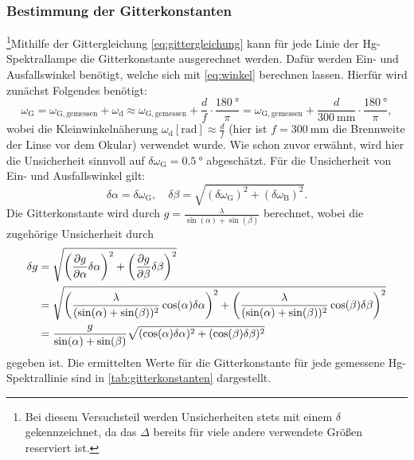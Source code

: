 \subsubsection{Bestimmung der Gitterkonstanten}\label{subsubsec:gitterkonstante}
\footnote[1]{Bei diesem Versuchsteil werden Unsicherheiten stets mit einem $\delta$ gekennzeichnet, da das $\Delta$ bereits für viele andere verwendete Größen reserviert ist.}Mithilfe der Gittergleichung \ref{eq:gittergleichung} kann für jede Linie der Hg-Spektrallampe die Gitterkonstante ausgerechnet werden. Dafür werden Ein- und Ausfallswinkel
benötigt, welche sich mit \cref{eq:winkel} berechnen lassen. Hierfür wird zunächst Folgendes benötigt:
\begin{equation*}
    \omega_{\mathrm{G}} = \omega_{\mathrm{G,gemessen}} + \omega_{\mathrm{d}} \approx \omega_{\mathrm{G,gemessen}} + \frac{d}{f} \cdot \frac{\SI{180}{\degree}}{\pi} = \omega_{\mathrm{G,gemessen}} + \frac{d}{\SI{300}{\milli \meter}} \cdot \frac{\SI{180}{\degree}}{\pi} ,
\end{equation*} wobei die Kleinwinkelnäherung $\omega_{\mathrm{d}} [\unit{\radian}] \approx \frac{d}{f}$ (hier ist $f = \SI{300}{\milli \meter}$ die Brennweite der Linse vor dem Okular) verwendet wurde.
Wie schon zuvor erwähnt, wird hier die Unsicherheit sinnvoll auf $\delta \omega_{\mathrm{G}} = \SI{0,5}{\degree}$ abgeschätzt. Für die Unsicherheit von Ein- und Ausfallswinkel gilt:
\begin{equation*}
    \delta \alpha = \delta \omega_{\mathrm{G}} , \quad \delta \beta = \sqrt{(\delta \omega_{\mathrm{G}})^2 + (\delta \omega_{\mathrm{B}})^2} .
\end{equation*} Die Gitterkonstante wird durch $g = \frac{\lambda}{\sin(\alpha) + \sin(\beta)}$ berechnet, wobei die zugehörige Unsicherheit durch
\begin{align*}
    \delta g &= \sqrt{\left(\pdv{g}{\alpha} \delta \alpha\right)^2 + \left(\pdv{g}{\beta} \delta \beta\right)^2} \\
    &= \sqrt{\left(\frac{\lambda}{(\sin(\alpha) + \sin(\beta))^2} \cos(\alpha) \delta \alpha\right)^2 + \left(\frac{\lambda}{(\sin(\alpha) + \sin(\beta))^2} \cos(\beta) \delta \beta\right)^2} \\
    &= \frac{g}{\sin(\alpha) + \sin(\beta)} \sqrt{(\cos(\alpha) \delta \alpha)^2 + (\cos(\beta) \delta \beta)^2}
\end{align*} gegeben ist. Die ermittelten Werte für die Gitterkonstante für jede gemessene Hg-Spektrallinie sind in \cref{tab:gitterkonstanten} dargestellt.
